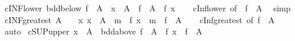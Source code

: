\begin{isabellebody}
\endisatagproof
{\isafoldproof}%
%
\isadelimproof
\isanewline
%
\endisadelimproof
\isanewline
{}\isamarkupfalse%
\ cINF{\isacharunderscore}{\kern0pt}lower{\isacharcolon}{\kern0pt}\ {\isachardoublequoteopen}bdd{\isacharunderscore}{\kern0pt}below\ {\isacharparenleft}{\kern0pt}f\ {\isacharbackquote}{\kern0pt}\ A{\isacharparenright}{\kern0pt}\ {\isasymLongrightarrow}\ x\ {\isasymin}\ A\ {\isasymLongrightarrow}\ {\isasymSqinter}{\isacharparenleft}{\kern0pt}f\ {\isacharbackquote}{\kern0pt}\ A{\isacharparenright}{\kern0pt}\ {\isasymle}\ f\ x{\isachardoublequoteclose}\isanewline
%
\isadelimproof
\ \ %
\endisadelimproof
%
\isatagproof
{}\isamarkupfalse%
\ cInf{\isacharunderscore}{\kern0pt}lower\ {\isacharbrackleft}{\kern0pt}of\ {\isacharunderscore}{\kern0pt}\ {\isachardoublequoteopen}f\ {\isacharbackquote}{\kern0pt}\ A{\isachardoublequoteclose}{\isacharbrackright}{\kern0pt}\ \isamarkupfalse%
\ simp%
\endisatagproof
{\isafoldproof}%
%
\isadelimproof
\isanewline
%
\endisadelimproof
\isanewline
{}\isamarkupfalse%
\ cINF{\isacharunderscore}{\kern0pt}greatest{\isacharcolon}{\kern0pt}\ {\isachardoublequoteopen}A\ {\isasymnoteq}\ {\isacharbraceleft}{\kern0pt}{\isacharbraceright}{\kern0pt}\ {\isasymLongrightarrow}\ {\isacharparenleft}{\kern0pt}{\isasymAnd}x{\isachardot}{\kern0pt}\ x\ {\isasymin}\ A\ {\isasymLongrightarrow}\ m\ {\isasymle}\ f\ x{\isacharparenright}{\kern0pt}\ {\isasymLongrightarrow}\ m\ {\isasymle}\ {\isasymSqinter}{\isacharparenleft}{\kern0pt}f\ {\isacharbackquote}{\kern0pt}\ A{\isacharparenright}{\kern0pt}{\isachardoublequoteclose}\isanewline
%
\isadelimproof
\ \ %
\endisadelimproof
%
\isatagproof
{}\isamarkupfalse%
\ cInf{\isacharunderscore}{\kern0pt}greatest\ {\isacharbrackleft}{\kern0pt}of\ {\isachardoublequoteopen}f\ {\isacharbackquote}{\kern0pt}\ A{\isachardoublequoteclose}{\isacharbrackright}{\kern0pt}\ \isamarkupfalse%
\ auto%
\endisatagproof
{\isafoldproof}%
%
\isadelimproof
\isanewline
%
\endisadelimproof
\isanewline
{}\isamarkupfalse%
\ cSUP{\isacharunderscore}{\kern0pt}upper{\isacharcolon}{\kern0pt}\ {\isachardoublequoteopen}x\ {\isasymin}\ A\ {\isasymLongrightarrow}\ bdd{\isacharunderscore}{\kern0pt}above\ {\isacharparenleft}{\kern0pt}f\ {\isacharbackquote}{\kern0pt}\ A{\isacharparenright}{\kern0pt}\ {\isasymLongrightarrow}\ f\ x\ {\isasymle}\ {\isasymSqunion}{\isacharparenleft}{\kern0pt}f\ {\isacharbackquote}{\kern0pt}\ A{\isacharparenright}{\kern0pt}{\isachardoublequoteclose}\isanewline
%
\isadelimproof
\ \ %
\endisadelimproof
%
\isatagproof

\end{isabellebody}
